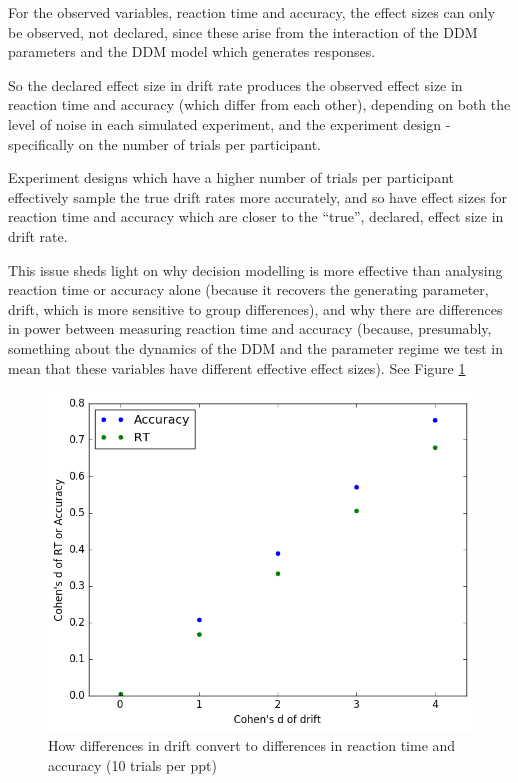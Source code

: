 \documentclass[floatsintext,doc]{apa6}
\theoremstyle{definition}
\theoremstyle{definition}
\theoremstyle{definition}
\theoremstyle{remark}
\begin{document}
For the observed variables, reaction time and accuracy, the effect sizes
can only be observed, not declared, since these arise from the
interaction of the DDM parameters and the DDM model which generates
responses.

So the declared effect size in drift rate produces the observed effect
size in reaction time and accuracy (which differ from each other),
depending on both the level of noise in each simulated experiment, and
the experiment design - specifically on the number of trials per
participant.

Experiment designs which have a higher number of trials per participant
effectively sample the true drift rates more accurately, and so have
effect sizes for reaction time and accuracy which are closer to the
\enquote{true}, declared, effect size in drift rate.

This issue sheds light on why decision modelling is more effective than
analysing reaction time or accuracy alone (because it recovers the
generating parameter, drift, which is more sensitive to group
differences), and why there are differences in power between measuring
reaction time and accuracy (because, presumably, something about the
dynamics of the DDM and the parameter regime we test in mean that these
variables have different effective effect sizes). See Figure
\ref{fig:effectsizes}

\begin{figure}
\centering
\includegraphics{figs/effectsizetranslation_40trials.png}
\caption{\label{fig:effectsizes}How differences in drift convert to
differences in reaction time and accuracy (10 trials per ppt)}
\end{figure}
\end{document}
